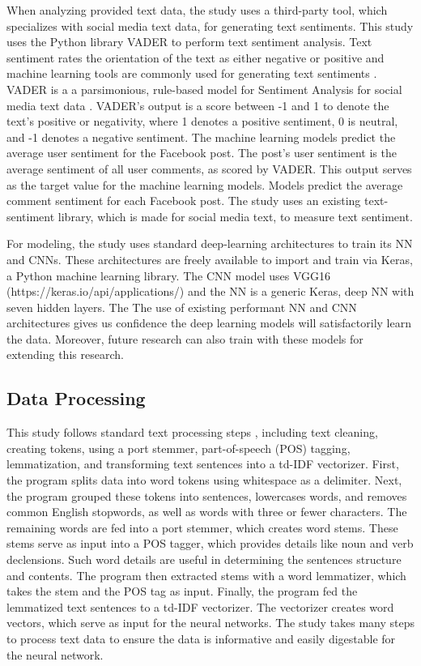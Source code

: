 \documentclass[mksc,blindrev]{informs3} %
\begin{document}
When analyzing provided text data, the study uses a third-party tool, which specializes with social media text data, for generating text sentiments. This study uses the Python library VADER to perform text sentiment analysis. Text sentiment rates the orientation of the text as either negative or positive and machine learning tools are commonly used for generating text sentiments \cite{HADDI201326}.  VADER is a a parsimonious, rule-based model for Sentiment Analysis for social media text data \cite{Gilbert}. VADER's output is a score between -1 and 1 to denote the text's positive or negativity, where 1 denotes a positive sentiment, 0 is neutral, and -1 denotes a negative sentiment. The machine learning models predict the average user sentiment for the Facebook post. The post's user sentiment is the average sentiment of all user comments, as scored by VADER. This output serves as the target value for the machine learning models. Models predict the average comment sentiment for each Facebook post. The study uses an existing text-sentiment library, which is made for social media text, to measure text sentiment.

For modeling, the study uses standard deep-learning architectures to train its NN and CNNs. These architectures are freely available to import and train via Keras, a Python machine learning library. The CNN model uses VGG16 (https://keras.io/api/applications/) and the NN is a generic Keras, deep NN with seven hidden layers. The The use of existing performant NN and CNN architectures gives us confidence the deep learning models will satisfactorily learn the data. Moreover, future research can also train with these models for extending this research.

\subsection{Data Processing}

This study follows standard text processing steps \cite{Camacho-Collados2019}, including text cleaning, creating tokens, using a port stemmer, part-of-speech (POS) tagging, lemmatization, and transforming text sentences into a td-IDF vectorizer. First, the program splits data into word tokens using whitespace as a delimiter. Next, the program grouped these tokens into sentences, lowercases words, and removes common English stopwords, as well as words with three or fewer characters. The remaining words are fed into a port stemmer, which creates word stems. These stems serve as input into a POS tagger, which provides details like noun and verb declensions. Such word details are useful in determining the sentences structure and contents. The program then extracted stems with a word lemmatizer, which takes the stem and the POS tag as input. Finally, the program fed the lemmatized text sentences to a td-IDF vectorizer. The vectorizer creates word vectors, which serve as input for the neural networks. The study takes many steps to process text data to ensure the data is informative and easily digestable for the neural network.
\end{document}
